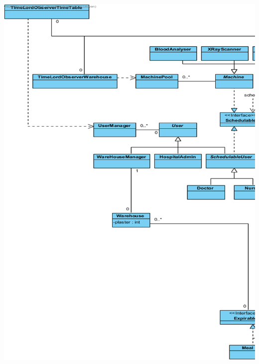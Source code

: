 \documentclass[11pt]{article}
\begin{document}
\includegraphics[width=170mm]{left1.png}\\
\end{document}
